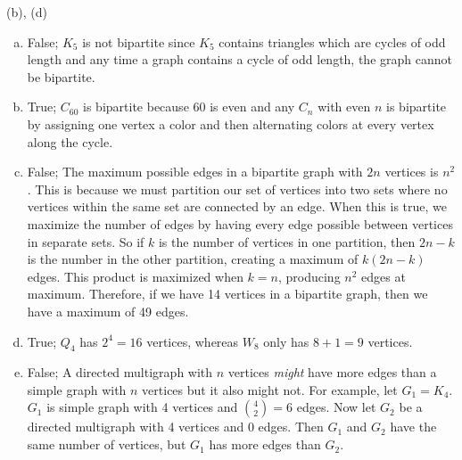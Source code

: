 \begin{solution}
(b), (d)\\
\begin{enumerate}[a)]
    \item False; $K_5$ is not bipartite since $K_5$ contains triangles which are cycles of odd length and any time a graph contains a cycle of odd length, the graph cannot be bipartite.
    \item True; $C_{60}$ is bipartite because $60$ is even and any $C_{n}$ with even $n$ is bipartite by assigning one vertex a color and then alternating colors at every vertex along the cycle.
    \item False; The maximum possible edges in a bipartite graph with $2n$ vertices is $n^2$. This is because we must partition our set of vertices into two sets where no vertices within the same set are connected by an edge. When this is true, we maximize the number of edges by having every edge possible between vertices in separate sets. So if $k$ is the number of vertices in one partition, then $2n - k$ is the number in the other partition, creating a maximum of $k(2n - k)$ edges. This product is maximized when $k = n$, producing $n^2$ edges at maximum. Therefore, if we have 14 vertices in a bipartite graph, then we have a maximum of 49 edges.
    \item True; $Q_4$ has $2^4 = 16$ vertices, whereas $W_8$ only has $8 + 1 = 9$ vertices.
    \item False; A directed multigraph with $n$ vertices \textit{might} have more edges than a simple graph with $n$ vertices but it also might not. For example, let $G_1 = K_4$. $G_1$ is simple graph with 4 vertices and $\binom{4}{2} = 6$ edges. Now let $G_2$ be a directed multigraph with 4 vertices and 0 edges. Then $G_1$ and $G_2$ have the same number of vertices, but $G_1$ has more edges than $G_2$.
\end{enumerate}
\end{solution}

